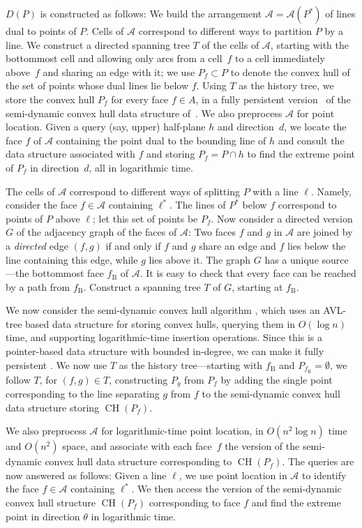 \documentclass{llncs}
\newcommand{\A}{\mathcal{A}}
\DeclareMathOperator{\conv}{CH}
\begin{document}
$D(P)$ is constructed as follows: We build the arrangement
$\A=\A(P^*)$ of lines dual to points of $P$.  Cells of $\A$ correspond
to different ways to partition $P$ by a line.  We construct a directed
spanning tree $T$ of the cells of $\A$, starting with the bottommost
cell and allowing only arcs from a cell~$f$ to a cell immediately
above~$f$ and sharing an edge with it; we use $P_f \subset P$ to denote
the convex hull of the set of points whose dual lines lie below $f$.  Using $T$ as the
history tree, we store the convex hull $P_f$ for every face $f \in
A$, in a fully persistent version~\cite{Bob} of the semi-dynamic
convex hull data structure of~\cite{Preparata}.  We also preprocess
$\A$ for point location.  Given a query (say, upper) half-plane $h$ and
direction~$d$, we locate the face $f$ of $\A$ containing the point
dual to the bounding line of $h$ and consult the data structure
associated with $f$ and storing $P_f=P\cap h$ to find the extreme
point of $P_f$ in direction~$d$, all in logarithmic time.  


\iffalse
The cells of $\A$
correspond to different ways of splitting $P$ with a line $\ell$.
Namely, consider the face $f \in \A$ containing $\ell^*$.  The lines
of $P^*$ below $f$ correspond to points of $P$ above $\ell$; let this
set of points be $P_f$.
Now consider a directed version $G$ of
the adjacency graph of the faces of $\A$: Two faces $f$ and $g$ in
$\A$ are joined by a \emph{directed} edge $(f,g)$ if and only if $f$
and $g$ share an edge and $f$ lies below the line containing this
edge, while $g$ lies above it.  The graph $G$ has a unique
source---the bottommost face $f_{\mathrm{B}}$ of $\A$.  It is easy to
check that every face can be reached by a path from $f_{\mathrm{B}}$.
Construct a spanning tree $T$ of $G$, starting at $f_{\mathrm{B}}$. 

We now consider the semi-dynamic convex hull algorithm
\cite{Preparata}, which uses an AVL-tree based data structure for
storing convex hulls, querying them in $O(\log n)$ time, and
supporting logarithmic-time insertion operations.  Since this is a
pointer-based data structure with bounded in-degree, we can make it
fully persistent \cite{Bob}.  We now use $T$ as the history
tree---starting with $f_{\mathrm{B}}$ and $P_{f_{\mathrm{B}}}=\emptyset$,
we follow $T$, for $(f,g) \in T$, constructing $P_g$ from $P_f$ by
adding the single point corresponding to the line separating $g$ from
$f$ to the semi-dynamic convex hull data structure storing $\conv(P_f)$. 

We also preprocess $\A$ for logarithmic-time point location, in
$O(n^2\log n)$ time and $O(n^2)$ space, and associate with each face~$f$
the version of the semi-dynamic convex hull data structure
corresponding to $\conv(P_f)$.  The queries are now answered as follows:
Given a line $\ell$, we use point location in $\A$ to identify the
face $f \in \A$ containing $\ell^*$.  We then access the version of the
semi-dynamic convex hull structure $\conv(P_f)$ corresponding to face
$f$ and find the extreme point in direction $\theta$ in logarithmic
time.
\end{document}
